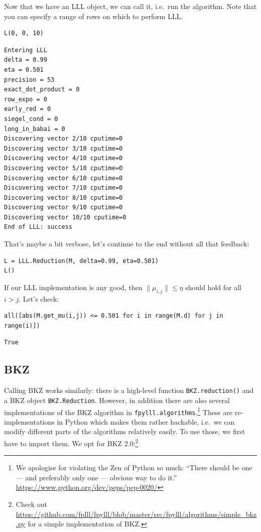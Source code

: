 \documentclass[10pt,a4paper]{tufte-handout}
\begin{document}
Now that we have an LLL object, we can call it, i.e. run the algorithm. Note that you can specify a range of rows on which to perform LLL.

\lstset{language=sage,label= ,caption= ,captionpos=b,numbers=none}
\begin{lstlisting}
L(0, 0, 10)
\end{lstlisting}

\begin{verbatim}
Entering LLL
delta = 0.99
eta = 0.501
precision = 53
exact_dot_product = 0
row_expo = 0
early_red = 0
siegel_cond = 0
long_in_babai = 0
Discovering vector 2/10 cputime=0
Discovering vector 3/10 cputime=0
Discovering vector 4/10 cputime=0
Discovering vector 5/10 cputime=0
Discovering vector 6/10 cputime=0
Discovering vector 7/10 cputime=0
Discovering vector 8/10 cputime=0
Discovering vector 9/10 cputime=0
Discovering vector 10/10 cputime=0
End of LLL: success
\end{verbatim}

That’s maybe a bit verbose, let’s continue to the end without all that feedback:

\lstset{language=sage,label= ,caption= ,captionpos=b,numbers=none}
\begin{lstlisting}
L = LLL.Reduction(M, delta=0.99, eta=0.501)  
L()
\end{lstlisting}

If our LLL implementation is any good, then \(\|μ_{i,j}\| ≤ η\) should hold for all \(i>j\). Let’s check:

\lstset{language=sage,label= ,caption= ,captionpos=b,numbers=none}
\begin{lstlisting}
all([abs(M.get_mu(i,j)) <= 0.501 for i in range(M.d) for j in range(i)])
\end{lstlisting}

\begin{verbatim}
True
\end{verbatim}

\subsection{BKZ}
\label{sec:orgcb47bdf}

Calling BKZ works similarly: there is a high-level function \texttt{BKZ.reduction()} and a BKZ object \texttt{BKZ.Reduction}. However, in addition there are also several implementations of the BKZ algorithm in \texttt{fpylll.algorithms}.\footnote{We apologise for violating the Zen of Python so much: “There should be one — and preferably only one — obvious way to do it.” \url{https://www.python.org/dev/peps/pep-0020/}} These are re-implementations in Python which makes them rather hackable, i.e. we can modify different parts of the algorithms relatively easily. To use those, we first have to import them. We opt for BKZ 2.0:\footnote{Check out \url{https://github.com/fplll/fpylll/blob/master/src/fpylll/algorithms/simple\_bkz.py} for a simple implementation of BKZ.}
\end{document}
